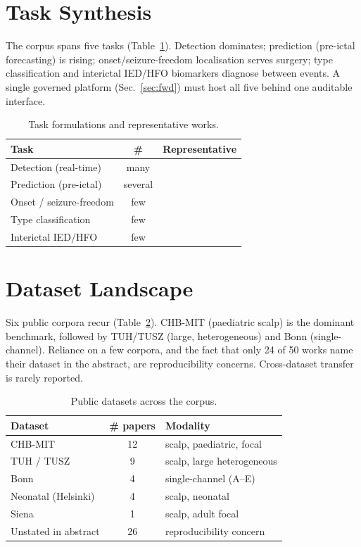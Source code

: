 \documentclass[10pt,journal,twocolumn]{IEEEtran}
\begin{document}
\section{Task Synthesis}
The corpus spans five tasks (Table~\ref{tab:task}). Detection dominates; prediction (pre-ictal forecasting) is rising; onset/seizure-freedom localisation serves surgery; type classification and interictal IED/HFO biomarkers diagnose between events. A single governed platform (Sec.~\ref{sec:fwd}) must host all five behind one auditable interface.
\begin{table}[h]\centering\caption{Task formulations and representative works.}\label{tab:task}
\footnotesize\begin{tabular}{lcl}\toprule
Task & \# & Representative\\\midrule
Detection (real-time) & many & \citep{ep241003385,ep260113234}\\
Prediction (pre-ictal) & several & \citep{ep251024986,ep260602166}\\
Onset / seizure-freedom & few & \citep{ep250215198}\\
Type classification & few & \citep{ep221104628}\\
Interictal IED/HFO & few & \citep{ep230108600,ep260522858}\\\bottomrule
\end{tabular}\end{table}

\section{Dataset Landscape}
Six public corpora recur (Table~\ref{tab:ds}). CHB-MIT (paediatric scalp) is the dominant benchmark, followed by TUH/TUSZ (large, heterogeneous) and Bonn (single-channel). Reliance on a few corpora, and the fact that only 24 of 50 works name their dataset in the abstract, are reproducibility concerns. Cross-dataset transfer is rarely reported.
\begin{table}[h]\centering\caption{Public datasets across the corpus.}\label{tab:ds}
\footnotesize\begin{tabular}{lcl}\toprule
Dataset & \# papers & Modality\\\midrule
CHB-MIT & 12 & scalp, paediatric, focal\\
TUH / TUSZ & 9 & scalp, large heterogeneous\\
Bonn & 4 & single-channel (A--E)\\
Neonatal (Helsinki) & 4 & scalp, neonatal\\
Siena & 1 & scalp, adult focal\\
Unstated in abstract & 26 & reproducibility concern\\\bottomrule
\end{tabular}\end{table}
\end{document}
